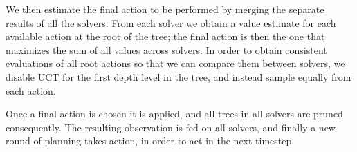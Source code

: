 We then estimate the final action to be performed by merging the separate results of all the
solvers. From each solver we obtain a value estimate for each available action at the root of the
tree; the final action is then the one that maximizes the sum of all values across solvers. In order
to obtain consistent evaluations of all root actions so that we can compare them between solvers, we
disable UCT for the first depth level in the tree, and instead sample equally from each action.

Once a final action is chosen it is applied, and all trees in all solvers are pruned consequently.
The resulting observation is fed on all solvers, and finally a new round of planning takes action,
in order to act in the next timestep.

%
%
%
